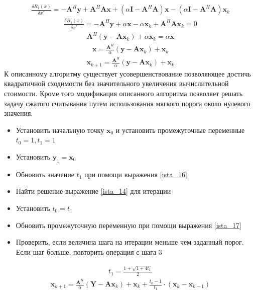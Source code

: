 \begin{align}
\frac{\delta R_1(x)}{\delta x^*}=-\mathbf{A}^H\mathbf{y} +\mathbf{A}^H\mathbf{A}\mathbf{x} +(\alpha \mathbf{I}-\mathbf{A}^H\mathbf{A})\mathbf{x} -(\alpha \mathbf{I}-\mathbf{A}^H\mathbf{A})\mathbf{x}_k \label{ista_11}
\end{align}
\begin{align}
\frac{\delta R_1(x)}{\delta x^*}=-\mathbf{A}^H\mathbf{y} +\alpha\mathbf{x} -\alpha\mathbf{x}_k+\mathbf{A}^H\mathbf{A}\mathbf{x}_k=0 \label{ista_12}
\end{align}
\begin{align}
\mathbf{A}^H(\mathbf{y} -\mathbf{A}\mathbf{x}_k) +\alpha\mathbf{x}_k =\alpha\mathbf{x} \label{ista_13}
\end{align}
\begin{align}
\mathbf{x}=\frac{\mathbf{A}^H}{\alpha}(\mathbf{y} -\mathbf{A}\mathbf{x}_k) +\mathbf{x}_k \label{ista_14}
\end{align}
\begin{align}
\mathbf{x}_{k+1}=\frac{\mathbf{A}^H}{\alpha}(\mathbf{y} -\mathbf{A}\mathbf{x}_k) +\mathbf{x}_k \label{ista_15}
\end{align}
К описанному алгоритму существует усовершенствование позволяющее достичь квадратичной сходимости без значительного увеличения вычислительной стоимости. Кроме того модификация описанного алгоритма позволяет решать задачу сжатого считывания путем использования мягкого порога около нулевого значения\cite{Book28}.
\begin{itemize}
\item Установить начальную точку $\mathbf{x}_0$ и установить промежуточные переменные $t_0=1, t_1=1$
\item Установить $\mathbf{y}_1=\mathbf{x}_0$
\item Обновить значение $t_1$ при помощи выражения \eqref{ista_16}
\item Найти решение выражение \eqref{ista_14} для итерации 
\item Установить $t_0=t_1$
\item Обновить промежуточную переменную при помощи выражения \eqref{ista_17}
\item Проверить, если величина шага на итерации меньше чем заданный порог. Если шаг больше, повторить операция с шага 3
\end{itemize}
\begin{align}
t_1=\frac{1+\sqrt{1+4t_1}}{2} \label{ista_16}
\end{align}
\begin{align}
\mathbf{x}_{k+1}=\frac{\mathbf{A}^H}{\alpha}(\mathbf{Y} -\mathbf{A}\mathbf{x}_k) +\mathbf{x}_k+\frac{t_0-1}{t_1}\cdot (\mathbf{x}_k-\mathbf{x}_{k-1}) \label{ista_17}
\end{align}
\clearpage